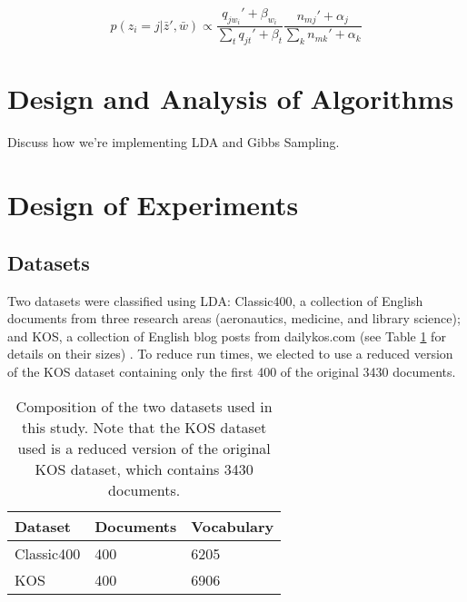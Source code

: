 \documentclass[10pt]{article}
\newcommand{\ra}[1]{\renewcommand{\arraystretch}{#1}}
\begin{document}
\begin{equation}
    p(z_i = j | \bar{z}', \bar{w}) \propto \frac{q_{j w_i}' + \beta_{w_i}}{\sum_t q_{jt}' + \beta_t} \frac{n_{mj}' + \alpha_j}{\sum_k n_{mk}' + \alpha_k}
\end{equation}



\section{Design and Analysis of Algorithms}
\label{sec:algorithms}

Discuss how we're implementing LDA and Gibbs Sampling.



\section{Design of Experiments}
\label{sec:experiments}

%
%
\subsection{Datasets}
Two datasets were classified using LDA: Classic400, a collection of English documents from three research areas (aeronautics, medicine, and library science); and KOS, a collection of English blog posts from dailykos.com (see Table \ref{tab:datasets} for details on their sizes) \cite{Classic400, KOS_dataset}. To reduce run times, we elected to use a reduced version of the KOS dataset containing only the first 400 of the original 3430 documents.


\begin{table}
    \centering
    \ra{1.2}
    \begin{tabular}{@{} l l l @{}}
        \toprule
        \bf{Dataset} & \bf{Documents} & \bf{Vocabulary} \\
        \midrule
        Classic400 & 400 & 6205 \\
        KOS        & 400 & 6906 \\
        \bottomrule
    \end{tabular}
    \caption{Composition of the two datasets used in this study. Note that the KOS dataset used is a reduced version of the original KOS dataset, which contains 3430 documents.}
    \label{tab:datasets}
\end{table}
\end{document}
